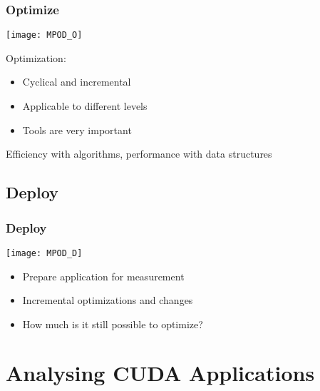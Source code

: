 \documentclass[10pt, compress]{beamer}
\begin{document}
\begin{frame}
    \frametitle{Optimize}
    \begin{center}
    \texttt{[image: MPOD\_O]}
    \end{center}

    \vfill

    \pause
    Optimization:
    \begin{itemize}
        \item \alert{Cyclical} \pause and \alert{incremental}
            \pause
        \item Applicable to \alert{different levels}
            \pause
        \item \alert{Tools} are very important
    \end{itemize}

    \pause
    \begin{center}
    \alert{Efficiency} with algorithms, \pause \alert{performance} with data structures
    \end{center}
\end{frame}

\subsection{Deploy}

\begin{frame}
    \frametitle{Deploy}
    \begin{center}
    \texttt{[image: MPOD\_D]}
    \end{center}

    \vfill

    \pause
    \begin{itemize}
        \item Prepare application for \alert{measurement}
            \pause
        \item \alert{Incremental} optimizations and changes
            \pause
        \item How much is it still \alert{possible} to optimize?
    \end{itemize}
\end{frame}

\section{Analysing CUDA Applications}
\end{document}

